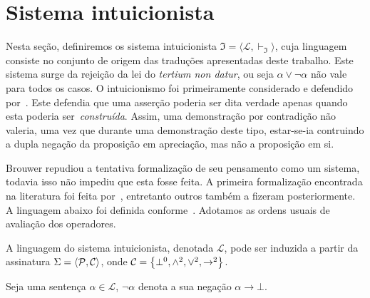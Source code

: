\section{Sistema intuicionista}

Nesta seção, definiremos os sistema intuicionista $\mathfrak{I}=\langle\mathcal{L},\vdash_\mathfrak{I}\rangle$, cuja linguagem consiste no conjunto de origem das traduções apresentadas deste trabalho.
Este sistema surge da rejeição da lei do \textit{tertium non datur}, ou seja $\alpha\mathrel{\vee}\neg\alpha$ não vale para todos os casos.
O intuicionismo foi primeiramente considerado e defendido por~\cite{Brouwer-A, Brouwer-B}.
Este defendia que uma asserção poderia ser dita verdade apenas quando esta poderia ser~\emph{construída}.
Assim, uma demonstração por contradição não valeria, uma vez que durante uma demonstração deste tipo, estar-se-ia contruindo a dupla negação da proposição em apreciação, mas não a proposição em si.

\vspace{0.5\baselineskip}
Brouwer repudiou a tentativa formalização de seu pensamento como um sistema, todavia isso não impediu que esta fosse feita.
A primeira formalização encontrada na literatura foi feita por~\cite{Kolmogorov}, entretanto outros também a fizeram posteriormente.
A linguagem abaixo foi definida conforme~\cite{Troelstra}. Adotamos as ordens usuais de avaliação dos operadores.

\vspace{0.5\baselineskip}
\begin{tcolorbox}[enhanced jigsaw, breakable, sharp corners, colframe=black, colback=white, boxrule=0.5pt, left=1.5mm, right=1.5mm, top=1.5mm, bottom=1.5mm]
    \begin{definition}[$\mathcal{L}$]\label{intuitionistic.language}
        A linguagem do sistema intuicionista, denotada $\mathcal{L}$, pode ser induzida a partir da assinatura $\Sigma=\langle\mathcal{P},\mathcal{C}\rangle$, onde $\mathcal{C}=\left\{\bot^0,\wedge^2,\vee^2,\to^2\right\}$.
    \end{definition}
\end{tcolorbox}

\begin{tcolorbox}[enhanced jigsaw, breakable, sharp corners, colframe=black, colback=white, boxrule=0.5pt, left=1.5mm, right=1.5mm, top=1.5mm, bottom=1.5mm]
    \begin{notation}
        Seja uma sentença $\alpha\in\mathcal{L}$, $\neg\alpha$ denota a sua negação $\alpha\to\bot$.
    \end{notation}
\end{tcolorbox}

